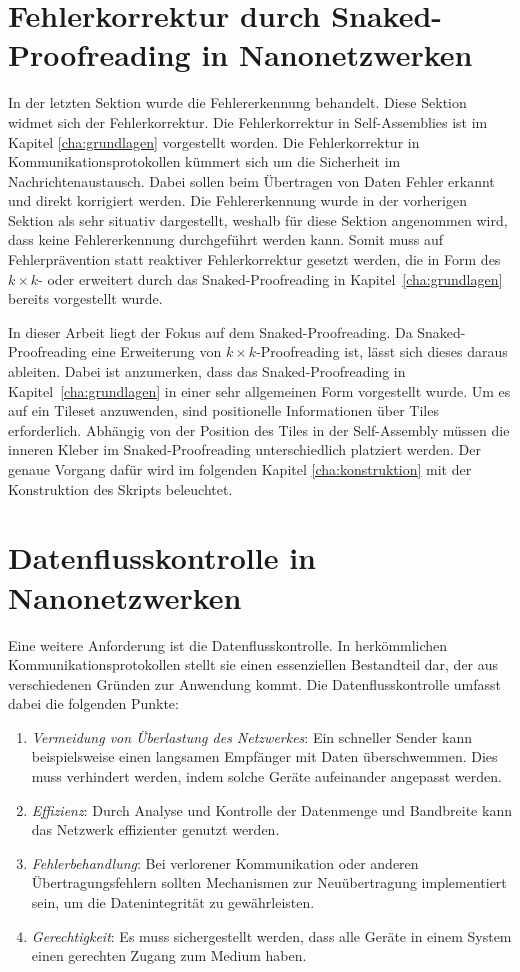 \section{Fehlerkorrektur durch Snaked-Proofreading in Nanonetzwerken}

In der letzten Sektion wurde die Fehlererkennung behandelt. Diese Sektion widmet sich der Fehlerkorrektur. Die Fehlerkorrektur in Self-Assemblies ist im Kapitel \ref{cha:grundlagen} vorgestellt worden.
Die Fehlerkorrektur in Kommunikationsprotokollen kümmert sich um die Sicherheit im Nachrichtenaustausch. Dabei sollen beim Übertragen von Daten Fehler erkannt und direkt korrigiert werden. Die Fehlererkennung wurde in der vorherigen Sektion als sehr situativ dargestellt, weshalb für diese Sektion angenommen wird, dass keine Fehlererkennung durchgeführt werden kann.  
Somit muss auf Fehlerprävention statt reaktiver Fehlerkorrektur gesetzt werden, die in Form des $k\times k$- oder erweitert durch das Snaked-Proofreading in Kapitel~\ref{cha:grundlagen} bereits vorgestellt wurde. 

In dieser Arbeit liegt der Fokus auf dem Snaked-Proofreading. Da Snaked-Proofreading eine Erweiterung von $k\times k$-Proofreading ist, lässt sich dieses daraus ableiten. Dabei ist anzumerken, dass das Snaked-Proofreading in Kapitel~\ref{cha:grundlagen} in einer sehr allgemeinen Form vorgestellt wurde.
Um es auf ein Tileset anzuwenden, sind positionelle Informationen über Tiles erforderlich. Abhängig von der Position des Tiles in der Self-Assembly müssen die inneren Kleber im Snaked-Proofreading unterschiedlich platziert werden. Der genaue Vorgang dafür wird im folgenden Kapitel \ref{cha:konstruktion} mit der Konstruktion des Skripts beleuchtet.

\section{Datenflusskontrolle in Nanonetzwerken}

Eine weitere Anforderung ist die Datenflusskontrolle. In herkömmlichen Kommunikationsprotokollen stellt sie einen essenziellen Bestandteil dar, der aus verschiedenen Gründen zur Anwendung kommt. Die Datenflusskontrolle umfasst dabei die folgenden Punkte:
\begin{enumerate}
    \item \emph{Vermeidung von Überlastung des Netzwerkes}: Ein schneller Sender kann beispielsweise einen langsamen Empfänger mit Daten überschwemmen. Dies muss verhindert werden, indem solche Geräte aufeinander angepasst werden.
    \item \emph{Effizienz}: Durch Analyse und Kontrolle der Datenmenge und Bandbreite kann das Netzwerk effizienter genutzt werden. 
    \item \emph{Fehlerbehandlung}: Bei verlorener Kommunikation oder anderen Übertragungsfehlern sollten Mechanismen zur Neuübertragung implementiert sein, um die Datenintegrität zu gewährleisten.
    \item \emph{Gerechtigkeit}: Es muss sichergestellt werden, dass alle Geräte in einem System einen gerechten Zugang zum Medium haben.
\end{enumerate}

